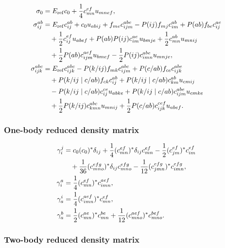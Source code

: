 \documentclass[11pt]{article}
\newcommand{\Eref}{E_{\mathrm{ref}}}
\begin{document}
\begin{align}
 \sigma_0
 &= \Eref c_0+\frac{1}{4}c_{mn}^{ef}u_{mnef},
 \\
 \sigma_{ij}^{ab}
 &= \Eref c_{ij}^{ab}+c_0u_{abij}
    +f_{me}c_{ijm}^{abe}
    -P(ij)f_{mj}c_{im}^{ab}
    +P(ab)f_{be}c_{ij}^{ae}
 \notag\\
 &\quad
    +\frac{1}{2}c_{ij}^{ef}u_{abef}
    +P(ab)P(ij)c_{im}^{ae}u_{bmje}
    +\frac{1}{2}c_{mn}^{ab}u_{mnij}
 \notag\\
 &\quad
    +\frac{1}{2}P(ab)c_{ijm}^{aef}u_{bmef}
    -\frac{1}{2}P(ij)c_{imn}^{abe}u_{mnje},
 \\
 \sigma_{ijk}^{abc}
 &= \Eref c_{ijk}^{abc}
    -P(k/ij)f_{mk}c_{ijm}^{abc}
    +P(c/ab)f_{ce}c_{ijk}^{abe}
 \notag\\
 &\quad
    +P(k/ij\mid c/ab)f_{ck}c_{ij}^{ab}
    +P(k/ij\mid c/ab)c_{km}^{ab}u_{cmij}
 \notag\\
 &\quad
    -P(k/ij\mid c/ab)c_{ij}^{ce}u_{abke}
    +P(k/ij\mid c/ab)c_{ijm}^{abe}u_{cmke}
 \notag\\
 &\quad
    +\frac{1}{2}P(k/ij)c_{kmn}^{abc}u_{mnij}
    +\frac{1}{2}P(c/ab)c_{ijk}^{cef}u_{abef}.
\end{align}

\subsubsection{One-body reduced density matrix}

\begin{align}
 \gamma^j_i
 &= c_0(c_0)^*\delta_{ij}
    +\frac{1}{4}(c_{mn}^{ef})^*\delta_{ij}c_{mn}^{ef}
    -\frac{1}{2}(c_{jm}^{ef})^*c_{im}^{ef}
 \notag\\
 &\quad
    +\frac{1}{36}(c_{mno}^{efg})^*\delta_{ij}c_{mno}^{efg}
    -\frac{1}{12}(c_{jmn}^{efg})^*c_{imn}^{efg},
 \\
 \gamma^a_i
 &= \frac{1}{4}(c_{mn}^{ef})^*c_{imn}^{aef},
 \\
 \gamma^i_a
 &= \frac{1}{4}(c_{imn}^{aef})^*c_{mn}^{ef},
 \\
 \gamma^b_a
 &= \frac{1}{2}(c_{mn}^{ae})^*c_{mn}^{be}
    +\frac{1}{12}(c_{mno}^{aef})^*c_{mno}^{bef}.
\end{align}

\clearpage
\subsubsection{Two-body reduced density matrix}
\end{document}
